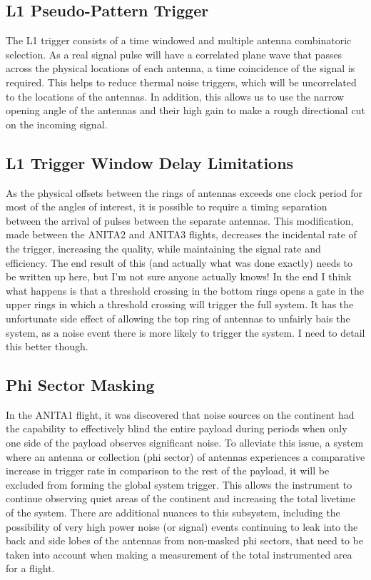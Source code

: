 		
	\subsection{L1 Pseudo-Pattern Trigger}
		The L1 trigger consists of a time windowed and multiple antenna combinatoric selection.  As a real signal pulse will have a correlated plane wave that passes across the physical locations of each antenna, a time coincidence of the signal is required.  This helps to reduce thermal noise triggers, which will be uncorrelated to the locations of the antennas.  In addition, this allows us to use the narrow opening angle of the antennas and their high gain to make a rough directional cut on the incoming signal.
		
	\subsection{L1 Trigger Window Delay Limitations}
		As the physical offsets between the rings of antennas exceeds one clock period for most of the angles of interest, it is possible to require a timing separation between the arrival of pulses between the separate antennas.  This modification, made between the ANITA2 and ANITA3 flights, decreases the incidental rate of the trigger, increasing the quality, while maintaining the signal rate and efficiency.  The end result of this (and actually what was done exactly) needs to be written up here, but I'm not sure anyone actually knows!  In the end I think what happens is that a threshold crossing in the bottom rings opens a gate in the upper rings in which a threshold crossing will trigger the full system.  It has the unfortunate side effect of allowing the top ring of antennas to unfairly bais the system, as a noise event there is more likely to trigger the system.  I need to detail this better though.

	\subsection{Phi Sector Masking}
		In the ANITA1 flight, it was discovered that noise sources on the continent had the capability to effectively blind the entire payload during periods when only one side of the payload observes significant noise.  To alleviate this issue, a system where an antenna or collection (phi sector) of antennas experiences a comparative increase in trigger rate in comparison to the rest of the payload, it will be excluded from forming the global system trigger.  This allows the instrument to continue observing quiet areas of the continent and increasing the total livetime of the system.  There are additional nuances to this subsystem, including the possibility of very high power noise (or signal) events continuing to leak into the back and side lobes of the antennas from non-masked phi sectors, that need to be taken into account when making a measurement of the total instrumented area for a flight.
		
